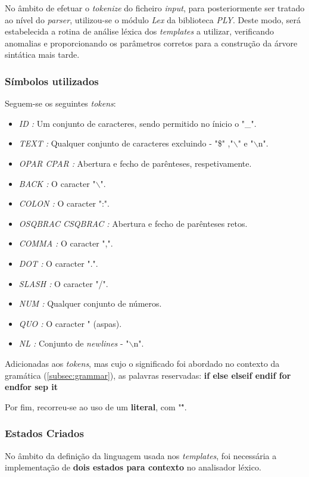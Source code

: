 \documentclass[../relatorio.tex]{subfiles}
\begin{document}
    No âmbito de efetuar o \textit{tokenize} do ficheiro \textit{input},
    para posteriormente ser tratado ao nível do \textit{parser}, 
    utilizou-se o módulo \textit{Lex} da biblioteca \textit{PLY}.
    Deste modo, será estabelecida a rotina de análise léxica 
    dos \textit{templates} a utilizar, verificando anomalias e
    proporcionando os parâmetros corretos para a construção da árvore 
    sintática mais tarde.

    \subsubsection{Símbolos utilizados}

    Seguem-se os seguintes \textit{tokens}:
    \begin{itemize}
        \item \textit{ID :} Um conjunto de caracteres, sendo permitido no ínicio o "\_".
        \item \textit{TEXT :} Qualquer conjunto de caracteres excluindo - "\$" ,"$\backslash$" e "$\backslash$n".
        \item \textit{OPAR CPAR :} Abertura e fecho de parênteses, respetivamente.
        \item \textit{BACK :} O caracter "$\backslash$".
        \item \textit{COLON :} O caracter ":".
        \item \textit{OSQBRAC CSQBRAC :} Abertura e fecho de parênteses retos.
        \item \textit{COMMA :} O caracter ",".
        \item \textit{DOT :} O caracter ".".
        \item \textit{SLASH :} O caracter "/".
        \item \textit{NUM :} Qualquer conjunto de números.
        \item \textit{QUO :} O caracter " (aspas).
        \item \textit{NL :} Conjunto de \textit{newlines} - "$\backslash$n".
    \end{itemize}

    Adicionadas aos \textit{tokens}, mas cujo o significado foi abordado
    no contexto da gramática (\ref{subsec:grammar}), as palavras reservadas:
        \textbf{if else elseif endif for endfor sep it}

    Por fim, recorreu-se ao uso de um \textbf{literal}, com "\^".

    \subsubsection{Estados Criados}
    No âmbito da definição da linguagem usada nos \textit{templates},
    foi necessária a implementação de \textbf{dois estados para contexto} no
    analisador léxico.
\end{document}

